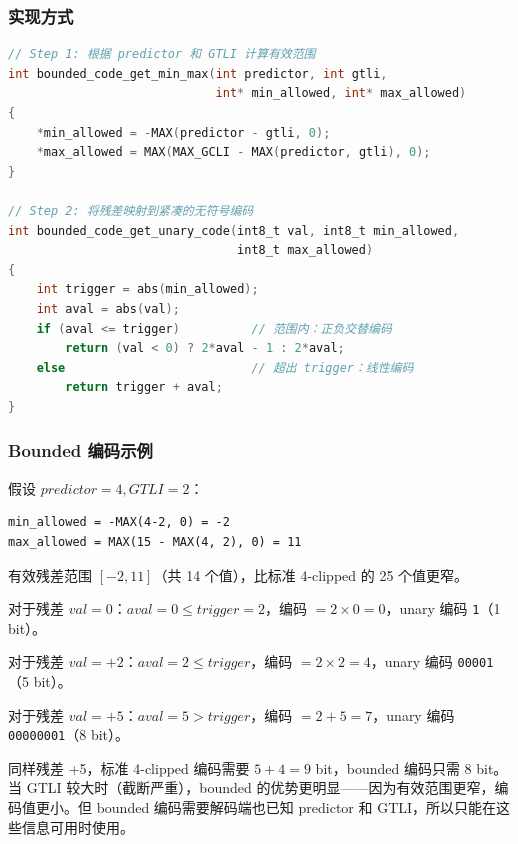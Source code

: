 \subsubsection{实现方式}

\begin{lstlisting}[language=C,numbers=none]
// Step 1: 根据 predictor 和 GTLI 计算有效范围
int bounded_code_get_min_max(int predictor, int gtli,
                             int* min_allowed, int* max_allowed)
{
    *min_allowed = -MAX(predictor - gtli, 0);
    *max_allowed = MAX(MAX_GCLI - MAX(predictor, gtli), 0);
}

// Step 2: 将残差映射到紧凑的无符号编码
int bounded_code_get_unary_code(int8_t val, int8_t min_allowed,
                                int8_t max_allowed)
{
    int trigger = abs(min_allowed);
    int aval = abs(val);
    if (aval <= trigger)          // 范围内：正负交替编码
        return (val < 0) ? 2*aval - 1 : 2*aval;
    else                          // 超出 trigger：线性编码
        return trigger + aval;
}
\end{lstlisting}

\subsubsection{Bounded 编码示例}

假设 $\mathit{predictor} = 4, \mathit{GTLI} = 2$：

\begin{lstlisting}[numbers=none]
min_allowed = -MAX(4-2, 0) = -2
max_allowed = MAX(15 - MAX(4, 2), 0) = 11
\end{lstlisting}

有效残差范围 $[-2, 11]$（共 14 个值），比标准 4-clipped 的 25 个值更窄。

对于残差 $\mathit{val} = 0$：$\mathit{aval} = 0 \leq \mathit{trigger} = 2$，编码 $= 2 \times 0 = 0$，unary 编码 \texttt{1}（1 bit）。

对于残差 $\mathit{val} = +2$：$\mathit{aval} = 2 \leq \mathit{trigger}$，编码 $= 2 \times 2 = 4$，unary 编码 \texttt{00001}（5 bit）。

对于残差 $\mathit{val} = +5$：$\mathit{aval} = 5 > \mathit{trigger}$，编码 $= 2 + 5 = 7$，unary 编码 \texttt{00000001}（8 bit）。

\begin{engineeringnote}
同样残差 +5，标准 4-clipped 编码需要 $5 + 4 = 9$ bit，bounded 编码只需 8 bit。当 GTLI 较大时（截断严重），bounded 的优势更明显——因为有效范围更窄，编码值更小。但 bounded 编码需要解码端也已知 predictor 和 GTLI，所以只能在这些信息可用时使用。
\end{engineeringnote}

